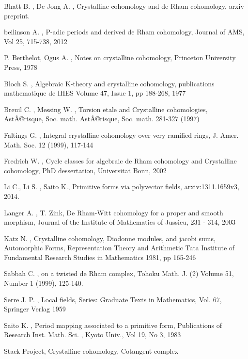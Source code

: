 \documentclass[12pt,twoside]{amsart}
\begin{document}
\begin{thebibliography}{99}

 Bhatt B. , De Jong A. , Crystalline cohomology and de Rham cohomology, arxiv preprint.

 beilinson A. , P-adic periods and derived de Rham cohomology, Journal of AMS, Vol 25, 715-738, 2012

 P. Berthelot, Ogus A. , Notes on crystalline cohomology, Princeton University Press, 1978

  Bloch S. , Algebraic K-theory and crystalline cohomology, publications mathematique de IHES Volume 47, Issue 1, pp 188-268, 1977

 Breuil C. , Messing W. , Torsion etale and Crystalline cohomologies, AstÃ©risque, Soc. math. AstÃ©risque, Soc. math. 281-327 (1997)

  Faltings G. , Integral crystalline cohomology over very ramified rings, J. Amer. Math. Soc. 12 (1999), 117-144

  Fredrich W. , Cycle classes for algebraic de Rham cohomology and Crystalline cohomology, PhD dessertation, Universitat Bonn, 2002

 Li C., Li S. , Saito K., Primitive forms via polyvector fields, arxiv:1311.1659v3, 2014. 

  Langer A. , T. Zink, De Rham-Witt cohomology for a proper and smooth morphism, Journal of the Institute of Mathematics of Jussieu, 231 - 314, 2003

  Katz N. , Crystalline cohomology, Diodonne modules, and jacobi sums, Automorphic Forms, Representation Theory and Arithmetic 
Tata Institute of Fundamental Research Studies in Mathematics 1981,   pp 165-246 

  Sabbah C. , on a twisted de Rham complex, Tohoku Math. J. (2) 
Volume 51, Number 1 (1999), 125-140.

  Serre J. P. , Local fields, Series: Graduate Texts in Mathematics, Vol. 67, Springer Verlag 1959

  Saito K. , Period mapping associated to a primitive form, Publications of Research Inst. Math. Sci. , Kyoto Univ., Vol 19, No 3, 1983

  Stack Project, Crystalline cohomology, Cotangent complex

\end{thebibliography}
\end{document}
